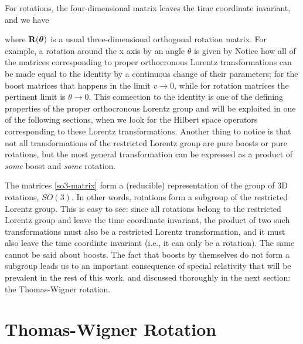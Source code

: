 \documentclass[12pt,a4paper,notitlepage]{report}
\begin{document}
For rotations, the four-dimensional matrix leaves the time coordinate invariant, and we have

%
where $\vb{R}(\vb*{\theta})$ is a usual three-dimensional orthogonal rotation matrix. For example, a rotation around the x axis by an angle $\theta$ is given by
%
%
Notice how all of the matrices corresponding to proper orthocronous Lorentz transformations can be made equal to the identity by a continuous change of their parameters; for the boost matrices that happens in the limit $v \rightarrow 0$, while for rotation matrices the pertinent limit is $\theta \rightarrow 0$. This connection to the identity is one of the defining properties of the proper orthocronous Lorentz group and will be exploited in one of the following sections, when we look for the Hilbert space operators corresponding to these Lorentz transformations. Another thing to notice is that not all transformations of the restricted Lorentz group are pure boosts or pure rotations, but the most general transformation can be expressed as a product of {\it some} boost and {\it some} rotation.

The matrices \eqref{so3-matrix} form a (reducible) representation of the group of 3D rotations, $SO(3)$. In other words, rotations form a subgroup of the restricted Lorentz group. This is easy to see: since all rotations belong to the restricted Lorentz group and leave the time coordinate invariant, the product of two such transformations must also be a restricted Lorentz transformation, and it must also leave the time coordinte invariant (i.e., it can only be a rotation). The same cannot be said about boosts. 
The fact that boosts by themselves do not form a subgroup leads us to an important consequence of special relativity that will be prevalent in the rest of this work, and discussed thoroughly in the next section: the Thomas-Wigner rotation.

\section{Thomas-Wigner Rotation}
\label{sec:twr}
\end{document}
